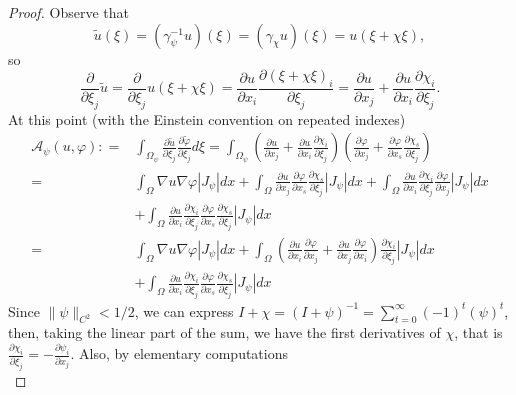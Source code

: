 \documentclass[10pt,a4paper]{amsart}
\begin{document}
\begin{proof}
Observe that
\begin{displaymath}
    \tilde u(\xi)=(\gamma_\psi^{-1} u)(\xi)=(\gamma_\chi u)(\xi) =u(\xi +\chi \xi), 
\end{displaymath}
so 
$$
\frac{\partial }{\partial \xi_j}\tilde u=\frac{\partial }{\partial \xi_j}u(\xi +\chi \xi)=
\frac{\partial u}{\partial x_i}
\frac{\partial (\xi +\chi \xi)_i}{ \partial \xi_j}
=\frac{\partial u}{\partial x_j}+
\frac{\partial u}{\partial x_i}\frac{\partial \chi_i}{ \partial \xi_j}.
$$
At this point (with the Einstein convention on repeated indexes)
\begin{align*}
\mathcal{A}_\psi(u,\varphi):
=&
\int_{\Omega_\psi} \frac{\partial \tilde u }{\partial \xi_j}\frac{\partial \tilde \varphi }{\partial \xi_j}d\xi
=\int_{\Omega_\psi} 
\left(
\frac{\partial u}{\partial x_j}+
\frac{\partial u}{\partial x_i}\frac{\partial \chi_i}{ \partial \xi_j}
\right)
\left(
\frac{\partial \varphi}{\partial x_j}+
\frac{\partial \varphi}{\partial x_s}\frac{\partial \chi_s}{ \partial \xi_j}
\right)\\
=&\int_\Omega \nabla u \nabla \varphi |J_\psi| dx+
\int_\Omega \frac{\partial u}{\partial x_j}
\frac{\partial \varphi}{\partial x_s}\frac{\partial \chi_s}{ \partial \xi_j}
|J_\psi| dx
+\int_\Omega \frac{\partial u}{\partial x_i}\frac{\partial \chi_i}{ \partial \xi_j}\frac{\partial \varphi}{\partial x_j}|J_\psi| dx\\
&+\int_\Omega \frac{\partial u}{\partial x_i}\frac{\partial \chi_i}{ \partial \xi_j}
\frac{\partial \varphi}{\partial x_s}\frac{\partial \chi_s}{ \partial \xi_j}
|J_\psi| dx\\
=&\int_\Omega \nabla u \nabla \varphi |J_\psi| dx+
\int_\Omega 
\left(\frac{\partial u}{\partial x_i}\frac{\partial \varphi}{\partial x_j}+
\frac{\partial u}{\partial x_j}\frac{\partial \varphi}{\partial x_i}
\right)\frac{\partial \chi_i}{ \partial \xi_j}
|J_\psi| dx\\
&+\int_\Omega \frac{\partial u}{\partial x_i}\frac{\partial \chi_i}{ \partial \xi_j}
\frac{\partial \varphi}{\partial x_s}\frac{\partial \chi_s}{ \partial \xi_j}
|J_\psi| dx
\end{align*}
Since $\|\psi\|_{C^2}<1/2$, we can express $I+\chi=(I+\psi)^{-1}=\sum_{t=0}^\infty (-1)^t(\psi)^t$, then, taking the linear part of the sum, we have the first derivatives of $\chi$, that is $\frac {\partial \chi_i}{\partial \xi_j} =-\frac {\partial \psi_i}{\partial x_j}$.
Also, by elementary computations
\begin{equation}

\end{equation}
\end{proof}
\end{document}
